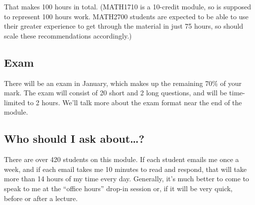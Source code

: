 \documentclass[
  a4paper,
]{book}
\theoremstyle{definition}
\theoremstyle{definition}
\theoremstyle{definition}
\theoremstyle{definition}
\theoremstyle{remark}
\begin{document}
That makes 100 hours in total. (MATH1710 is a 10-credit module, so is supposed to represent 100 hours work. MATH2700 students are expected to be able to use their greater experience to get through the material in just 75 hours, so should scale these recommendations accordingly.)

\hypertarget{exam}{%
\subsection*{Exam}\label{exam}}

There will be an exam in January, which makes up the remaining 70\% of your mark. The exam will consist of 20 short and 2 long questions, and will be time-limited to 2 hours. We'll talk more about the exam format near the end of the module.

\hypertarget{ask}{%
\subsection*{Who should I ask about\ldots?}\label{ask}}

There are over 420 students on this module. If each student emails me once a week, and if each email takes me 10 minutes to read and respond, that will take more than 14 hours of my time every day. Generally, it's much better to come to speak to me at the ``office hours'' drop-in session or, if it will be very quick, before or after a lecture.
\end{document}

